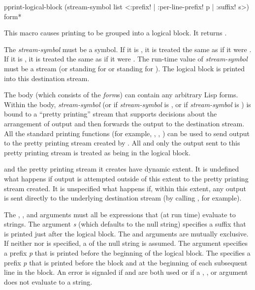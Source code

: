 \begin{defmac}
pprint-logical-block (stream-symbol list
                      <{\!:prefix! | \!:per-line-prefix!} p | \!:suffix! s>)  
                     {form}*

This macro causes printing to be grouped into a logical block.  It returns
.

The \emph{stream-symbol} must be a symbol.  If it is , it is treated the same
as if it were .  If it is , it is treated the same as if
it were .  The run-time value of \emph{stream-symbol} must
be a stream (or  standing for 
or  standing for ).
The logical block is printed into this destination stream.

The body (which consists of the \emph{form\/}s)
can contain any arbitrary Lisp forms.  Within the body,
\emph{stream-symbol} (or  if \emph{stream-symbol} is
, or  if \emph{stream-symbol} is ) is bound
to a ``pretty printing'' stream that supports decisions about the arrangement
of output and then forwards the output to the destination stream.  All the
standard printing functions (for example, , , ) can
be used to send output to the pretty printing stream created by
.  All and only the output sent to this pretty
printing stream is treated as being in the logical block.

 and the pretty printing stream it creates have dynamic
extent.  It is undefined what happens if output is attempted outside of
this extent to the pretty printing stream created.  It is unspecified what
happens if, within this extent, any output is sent directly to the
underlying destination stream (by calling , for example).

The , , and  arguments must all
be expressions that (at run time) evaluate to strings.  The  argument \emph{s}
(which defaults to the null string) specifies a suffix that is printed just
after the logical block.  The  and  arguments
are mutually exclusive.  If neither  nor  is 
specified, a  of the null string is assumed.
The  argument
specifies a prefix \emph{p} that is printed before the beginning of the logical block.
The  specifies a prefix \emph{p} that is printed before the block 
and at the beginning of each subsequent line in the block.
An error is signaled if  and  are both used
or if a , , or  argument does not
evaluate to a string.


\end{defmac}
